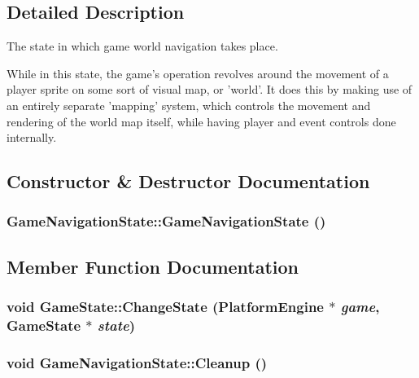 \subsection{Detailed Description}
The state in which game world navigation takes place. 

While in this state, the game's operation revolves around the movement of a player sprite on some sort of visual map, or 'world'. It does this by making use of an entirely separate 'mapping' system, which controls the movement and rendering of the world map itself, while having player and event controls done internally. 

\subsection{Constructor \& Destructor Documentation}
\hypertarget{class_game_navigation_state_6a3b93831c85eb5dc3de0a53ca13ddfc}{
\subsubsection[{GameNavigationState}]{\setlength{\rightskip}{0pt plus 5cm}GameNavigationState::GameNavigationState ()}}
\label{de/d2a/class_game_navigation_state_6a3b93831c85eb5dc3de0a53ca13ddfc}




\subsection{Member Function Documentation}
\hypertarget{class_game_state_f786aeb704a22a135dc289bb89fcc452}{
\subsubsection[{ChangeState}]{\setlength{\rightskip}{0pt plus 5cm}void GameState::ChangeState ({\bf PlatformEngine} $\ast$ {\em game}, \/  {\bf GameState} $\ast$ {\em state})}}
\label{dd/d87/class_game_state_f786aeb704a22a135dc289bb89fcc452}


\hypertarget{class_game_navigation_state_f93a7dbb7eac4b14a6d59cbca32b9abd}{
\subsubsection[{Cleanup}]{\setlength{\rightskip}{0pt plus 5cm}void GameNavigationState::Cleanup ()}}
\label{de/d2a/class_game_navigation_state_f93a7dbb7eac4b14a6d59cbca32b9abd}


